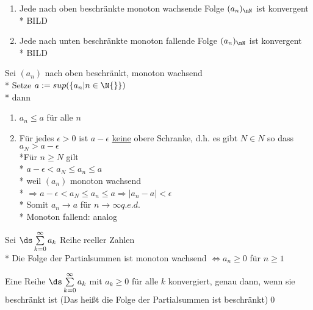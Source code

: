 \begin{enumerate}
\item{Jede nach oben beschränkte monoton wachsende Folge $(a_n)_{\nN}$ ist konvergent\\*
BILD
}
\item{Jede nach unten beschränkte monoton fallende Folge $(a_n)_\nN$ ist konvergent\\*
BILD
}
\end{enumerate}
\bew
Sei $(a_n)$ nach oben beschränkt, monoton wachsend\\*
Setze $a:= sup(\{a_n | n \in \N{}\})$\\*
dann \begin{enumerate}
\item{$a_n \leq a$ für alle $n$}
\item{Für jedes $\epsilon > 0$ ist $a - \epsilon$ \ul{keine} obere Schranke, d.h. es gibt $N \in N$ so dass $a_N > a - \epsilon$
\\*Für $n \geq N$ gilt\\*
$a - \epsilon < a_N \leq a_n \leq a$\\*
weil $(a_n)$ monoton wachsend\\*
$\Rightarrow a - \epsilon < a_N \leq a_n \leq a \Rightarrow |a_n -a| < \epsilon$\\*
Somit $a_n \to a$ für $n \to \infty$\phantom{XXX}$q.e.d.$\\*
Monoton fallend: analog}
\end{enumerate}

\bem
Sei $\ds\sum\limits_{k=0}^{\infty} a_k$ Reihe reeller Zahlen\\*
Die Folge der Partialsummen ist monoton wachsend $\Leftrightarrow a_n \geq 0$ für $n \geq 1$

Eine Reihe $\ds\sum\limits_{k=0}^{\infty} a_k$ mit $a_k \geq 0$ für alle $k$ konvergiert, genau dann, wenn sie beschränkt ist (Das heißt die Folge der Partialsummen ist beschränkt)\qed


